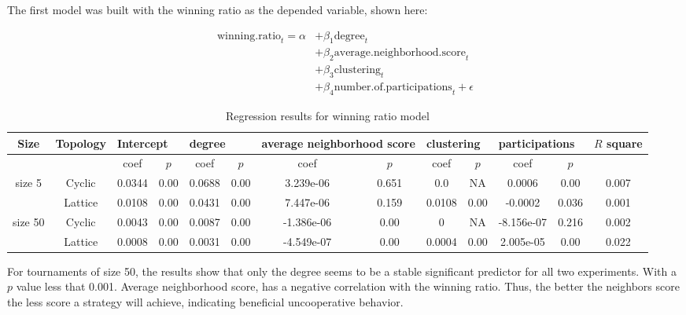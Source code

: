 The first model was built with the winning ratio as the depended variable,
shown here:

\begin{align}
	\mathrm{winning.ratio}_{t} = \alpha
	  & + \beta_{1}  \mathrm{degree}_{t}                              \\
	  & + \beta_{2}  \mathrm{average.neighborhood.score}_{t}          \\
	  & + \beta_{3}  \mathrm{clustering}_{t}                          \\
	  & + \beta_{4}  \mathrm{number.of.participations}_{t} + \epsilon
\end{align}

\begin{table}[!hbtp]
	\centering
	\begin{adjustbox}{width=1\textwidth, height=0.15\textwidth}
		\small
		\begin{tabular}{ccccccccccccc}
				\toprule
			Size 		& \multicolumn{1}{|l|}{Topology} & \multicolumn{2}{l|}{Intercept} & \multicolumn{2}{l|}{degree} & \multicolumn{2}{l|}{average neighborhood score} & \multicolumn{2}{l|}{clustering} & \multicolumn{2}{l|}{participations} & \(R\) square \\ \midrule
			        &         & coef   & \(p\)    & coef   & \(p\)    & coef       & \(p\)     & coef   & \(p\)    & coef       & \(p\)     &       \\ \midrule
			size 5  & Cyclic  & 0.0344 & 0.00 & 0.0688 & 0.00 & 3.239e-06  & 0.651 & 0.0    & NA   & 0.0006     & 0.00  & 0.007 \\ \midrule
			        & Lattice & 0.0108 & 0.00 & 0.0431 & 0.00 & 7.447e-06  & 0.159 & 0.0108 & 0.00 & -0.0002    & 0.036 & 0.001 \\ \midrule
			size 50 & Cyclic  & 0.0043 & 0.00 & 0.0087 & 0.00 & -1.386e-06 & 0.00  & 0      & NA   & -8.156e-07 & 0.216 & 0.002 \\ \midrule
			        & Lattice & 0.0008 & 0.00 & 0.0031 & 0.00 & -4.549e-07 & 0.00  & 0.0004 & 0.00 & 2.005e-05  & 0.00  & 0.022 \\ \bottomrule
		\end{tabular}
	\end{adjustbox}
	\caption{Regression results for winning ratio model}
	\label{regression-winning}
\end{table}

For tournaments of size 50, the results show that only the degree seems
to be a stable significant predictor for all two experiments. With a \(p\)
value less that 0.001. Average neighborhood score, has a negative correlation
with the winning ratio. Thus, the better the neighbors score the
less score a strategy will achieve, indicating beneficial uncooperative behavior.

